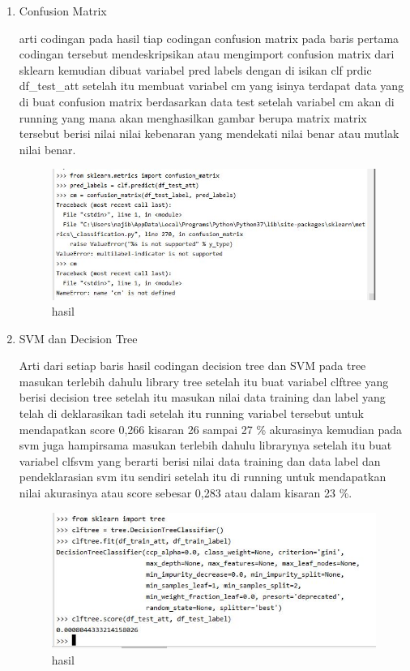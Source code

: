 \begin{enumerate}
\item Confusion Matrix\par
arti codingan pada hasil tiap codingan confusion matrix pada baris pertama codingan tersebut mendeskripsikan atau mengimport confusion matrix dari sklearn kemudian dibuat variabel pred labels dengan di isikan clf prdic df\_test\_att setelah itu membuat variabel cm yang isinya terdapat data yang di buat confusion matrix berdasarkan data test setelah variabel cm akan di running yang mana akan menghasilkan gambar berupa matrix matrix tersebut berisi nilai nilai kebenaran yang mendekati nilai benar atau mutlak nilai benar.

\begin{figure}[ht]
\centering
\includegraphics[scale=0.5]{figures/1174051/3/8.JPG}
\caption{hasil}
\label{contoh}
\end{figure}

\item SVM dan Decision Tree\par
Arti dari setiap baris hasil codingan decision tree dan SVM pada tree masukan terlebih dahulu library tree setelah itu buat variabel clftree yang berisi decision tree setelah itu masukan nilai data training dan label yang telah di deklarasikan tadi setelah itu running variabel tersebut untuk mendapatkan score 0,266 kisaran 26 sampai 27 \% akurasinya kemudian pada svm juga hampirsama masukan terlebih dahulu librarynya setelah itu buat variabel clfsvm yang berarti berisi nilai data training dan data label dan pendeklarasian svm itu sendiri setelah itu di running untuk mendapatkan nilai akurasinya atau score sebesar 0,283 atau dalam kisaran 23 \%.

\begin{figure}[ht]
\centering
\includegraphics[scale=0.5]{figures/1174051/3/9.JPG}
\caption{hasil}
\label{contoh}
\end{figure}


\end{enumerate}
